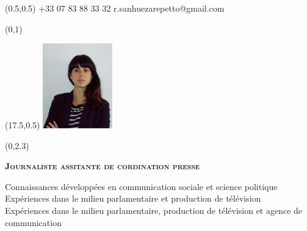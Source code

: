 \documentclass[30pt, french]{tccv}
\begin{document}
\begin{upshape}
\fontsize{9pt}{1em}\color{text}\selectfont



%
%




\begin{textblock}{6.5}(0.5,0.5)
    {+33 07 83 88 33 32}
    {r.sanhuezarepetto@gmail.com}
\end{textblock}

\begin{textblock}{21}(0,1)
\end{textblock}

\begin{textblock}{21}(17.5,0.5)
		\includegraphics[width=3cm]{../Figure/Rocio3.png}
\end{textblock}  



\begin{textblock}{21}(0,2.3)

\begin{center}
\fontsize{10pt}{1.5em}\color{text}\bodyfontlight\upshape\selectfont

	{\fontsize{14pt}{5em}\scshape\bfseries Journaliste assitante de cordination presse \\} 

	\vspace{5pt}
Connaissances développées en communication sociale et science politique 			\\
Expériences dans le milieu parlamentaire et production de télévision  		 	\\
Expériences dans le milieu parlamentaire, production de télévision et agence de communication 	\\


\end{center}
\end{textblock}
\end{upshape}
\end{document}
